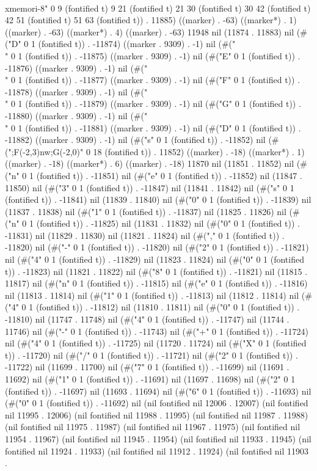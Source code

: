          \\xmemori{-8}" 0 9 (fontified t) 9 21 (fontified t) 21 30 (fontified t) 30 42 (fontified t) 42 51 (fontified t) 51 63 (fontified t)) . 11885) ((marker) . -63) ((marker*) . 1) ((marker) . -63) ((marker*) . 4) ((marker) . -63) 11948 nil (11874 . 11883) nil (#("D" 0 1 (fontified t)) . -11874) ((marker . 9309) . -1) nil (#("\\" 0 1 (fontified t)) . -11875) ((marker . 9309) . -1) nil (#("E" 0 1 (fontified t)) . -11876) ((marker . 9309) . -1) nil (#("\\" 0 1 (fontified t)) . -11877) ((marker . 9309) . -1) nil (#("F" 0 1 (fontified t)) . -11878) ((marker . 9309) . -1) nil (#("\\" 0 1 (fontified t)) . -11879) ((marker . 9309) . -1) nil (#("G" 0 1 (fontified t)) . -11880) ((marker . 9309) . -1) nil (#("\\" 0 1 (fontified t)) . -11881) ((marker . 9309) . -1) nil (#("D" 0 1 (fontified t)) . -11882) ((marker . 9309) . -1) nil (#("s" 0 1 (fontified t)) . -11852) nil (#(";F(-2,3)nw;G(-2,0)" 0 18 (fontified t)) . 11852) ((marker) . -18) ((marker*) . 1) ((marker) . -18) ((marker*) . 6) ((marker) . -18) 11870 nil (11851 . 11852) nil (#("n" 0 1 (fontified t)) . -11851) nil (#("e" 0 1 (fontified t)) . -11852) nil (11847 . 11850) nil (#("3" 0 1 (fontified t)) . -11847) nil (11841 . 11842) nil (#("s" 0 1 (fontified t)) . -11841) nil (11839 . 11840) nil (#("0" 0 1 (fontified t)) . -11839) nil (11837 . 11838) nil (#("1" 0 1 (fontified t)) . -11837) nil (11825 . 11826) nil (#("n" 0 1 (fontified t)) . -11825) nil (11831 . 11832) nil (#("0" 0 1 (fontified t)) . -11831) nil (11829 . 11830) nil (11821 . 11824) nil (#("," 0 1 (fontified t)) . -11820) nil (#("-" 0 1 (fontified t)) . -11820) nil (#("2" 0 1 (fontified t)) . -11821) nil (#("4" 0 1 (fontified t)) . -11829) nil (11823 . 11824) nil (#("0" 0 1 (fontified t)) . -11823) nil (11821 . 11822) nil (#("8" 0 1 (fontified t)) . -11821) nil (11815 . 11817) nil (#("n" 0 1 (fontified t)) . -11815) nil (#("e" 0 1 (fontified t)) . -11816) nil (11813 . 11814) nil (#("1" 0 1 (fontified t)) . -11813) nil (11812 . 11814) nil (#("4" 0 1 (fontified t)) . -11812) nil (11810 . 11811) nil (#("0" 0 1 (fontified t)) . -11810) nil (11747 . 11748) nil (#("4" 0 1 (fontified t)) . -11747) nil (11744 . 11746) nil (#("-" 0 1 (fontified t)) . -11743) nil (#("+" 0 1 (fontified t)) . -11724) nil (#("4" 0 1 (fontified t)) . -11725) nil (11720 . 11724) nil (#("X" 0 1 (fontified t)) . -11720) nil (#("/" 0 1 (fontified t)) . -11721) nil (#("2" 0 1 (fontified t)) . -11722) nil (11699 . 11700) nil (#("7" 0 1 (fontified t)) . -11699) nil (11691 . 11692) nil (#("1" 0 1 (fontified t)) . -11691) nil (11697 . 11698) nil (#("2" 0 1 (fontified t)) . -11697) nil (11693 . 11694) nil (#("6" 0 1 (fontified t)) . -11693) nil (#("0" 0 1 (fontified t)) . -11692) nil (nil fontified nil 12006 . 12007) (nil fontified nil 11995 . 12006) (nil fontified nil 11988 . 11995) (nil fontified nil 11987 . 11988) (nil fontified nil 11975 . 11987) (nil fontified nil 11967 . 11975) (nil fontified nil 11954 . 11967) (nil fontified nil 11945 . 11954) (nil fontified nil 11933 . 11945) (nil fontified nil 11924 . 11933) (nil fontified nil 11912 . 11924) (nil fontified nil 11903 . 